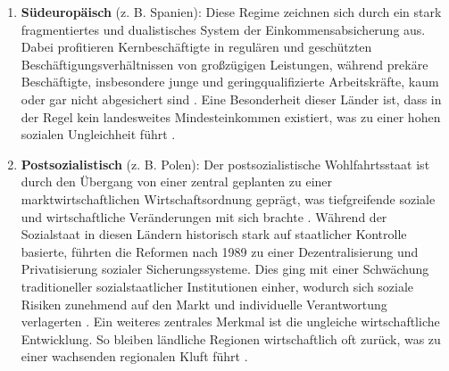 \begin{enumerate}

    \item \textbf{Südeuropäisch} (z. B. Spanien): Diese Regime zeichnen sich durch ein stark 
    fragmentiertes und dualistisches System der Einkommensabsicherung aus. Dabei profitieren 
    Kernbeschäftigte in regulären und geschützten Beschäftigungsverhältnissen von großzügigen 
    Leistungen, während prekäre Beschäftigte, insbesondere junge und geringqualifizierte 
    Arbeitskräfte, kaum oder gar nicht abgesichert sind 
    \parencite[S. 20–21]{ferrera1996thesouthern}. Eine Besonderheit dieser Länder ist, dass in 
    der Regel kein landesweites Mindesteinkommen existiert, was zu einer hohen sozialen 
    Ungleichheit führt \parencite[S. 20]{ferrera1996thesouthern}. 


    \item \textbf{Postsozialistisch} (z. B. Polen): Der postsozialistische Wohlfahrtsstaat ist 
    durch den Übergang von einer zentral geplanten zu einer marktwirtschaftlichen 
    Wirtschaftsordnung geprägt, was tiefgreifende soziale und wirtschaftliche Veränderungen mit 
    sich brachte \parencite[S. 104]{cerami2006socialpolicy}. Während der Sozialstaat in diesen 
    Ländern historisch stark auf staatlicher Kontrolle basierte, führten die Reformen nach 1989 
    zu einer Dezentralisierung und Privatisierung sozialer Sicherungssysteme. Dies ging mit einer 
    Schwächung traditioneller sozialstaatlicher Institutionen einher, wodurch sich soziale 
    Risiken zunehmend auf den Markt und individuelle Verantwortung verlagerten 
    \parencite[vgl.][S. 104–105]{cerami2006socialpolicy}. Ein weiteres zentrales Merkmal ist die 
    ungleiche wirtschaftliche Entwicklung. So bleiben ländliche Regionen wirtschaftlich oft 
    zurück, was zu einer wachsenden regionalen Kluft führt 
    \parencite[vgl.][S. 104–105]{cerami2006socialpolicy}. 
    
\end{enumerate}

